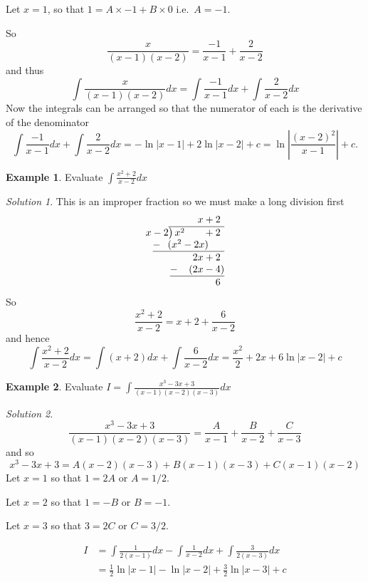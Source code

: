 \documentclass[
  11pt,
  oneside]{book}
\newcommand{\slide}{}
\theoremstyle{definition}
\theoremstyle{definition}
\newtheorem{example}{Example}[chapter]
\theoremstyle{definition}
\theoremstyle{definition}
\theoremstyle{remark}
\newtheorem*{solution}{Solution}
\begin{document}
Let \(x=1\), so that \(1=A\times-1+B\times0\) i.e.~\(A=-1\).

So
\[
\frac{x}{(x-1)(x-2)} = \frac {-1}{x-1}+\frac 2{x-2}
\]
and thus
\[
\int\frac{x}{(x-1)(x-2)}dx = \int\frac {-1}{x-1}dx+\int\frac 2{x-2}dx
\]
Now the integrals can be arranged so that the numerator of each is the derivative of the denominator
\[
\int\frac {-1}{x-1}dx+\int\frac 2{x-2}dx = -\ln|x-1|+2\ln|x-2|+c = \ln\left|\frac{(x-2)^2}{x-1}\right|+c.
\]
\slide

\begin{example}
Evaluate \(\displaystyle\int\frac{x^2+2}{x-2}dx\)
\end{example}

\begin{solution}
This is an improper fraction so we must make a long division first
\[
\begin{array}{r}
x+2\phantom{)}   \\
x-2{\overline{\smash{\big)}\,x^2\phantom{+2x}+2\phantom{)}}}\\
\underline{-~\phantom{(}(x^2-2x)\phantom{-b)}}\\
\phantom{0+}2x+2\phantom{)}\\ 
\underline{-~\phantom{()}(2x-4)}\\ 
\phantom{0+}6\phantom{)}
\end{array}
\]
So
\[
\frac{x^2+2}{x-2} = x+2+\frac6{x-2}
\]
and hence
\[
\int\frac{x^2+2}{x-2}dx = \int (x+2)dx+\int\frac6{x-2}dx = \frac{x^2}{2}+2x+6\ln|x-2|+c
\]
\end{solution}

\slide

\begin{example}
Evaluate \(I = \displaystyle\int\frac{x^3-3x+3}{(x-1)(x-2)(x-3)} dx\)
\end{example}

\begin{solution}
\[
\frac{x^3-3x+3}{(x-1)(x-2)(x-3)} = \frac A{x-1}+\frac B{x-2}+\frac C{x-3}
\]
and so
\[
x^3-3x+3 = A(x-2)(x-3) + B(x-1)(x-3) + C(x-1)(x-2)
\]
Let \(x=1\) so that \(1=2A\) or \(A=1/2\).

Let \(x=2\) so that \(1=-B\) or \(B=-1\).

Let \(x=3\) so that \(3=2C\) or \(C=3/2\).

\begin{align*}
I&= \int\frac 1{2(x-1)}dx-\int\frac 1{x-2}dx+\int\frac 3{2(x-3)}dx\\
&=\frac 12\ln|x-1| -\ln|x-2| + \frac 32\ln|x-3|+c
\end{align*}
\end{solution}
\end{document}
